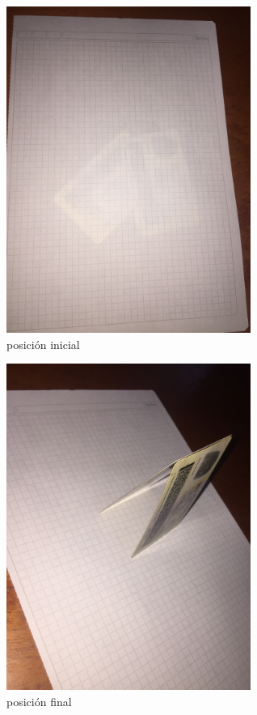 \documentclass{article}
\begin{document}
\begin{figure}[h]
\includegraphics[width=8cm]{posición1.JPG}
\centering
\caption{posición inicial}
\label{fig:pocision1}
\end{figure}

\begin{figure}[h]
\includegraphics[width=8cm]{posición2.JPG}
\centering
\caption{posición final}
\label{fig:pocision2}
\end{figure}
\end{document}
